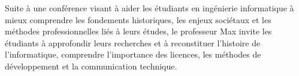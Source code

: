 Suite à une conférence visant à aider les étudiants en ingénierie informatique à mieux comprendre les fondements historiques, les enjeux sociétaux et les méthodes professionnelles liés à leurs études, le professeur Max invite les étudiants à approfondir leurs recherches et à reconstituer l’histoire de l’informatique, comprendre l’importance des licences, les méthodes de développement et la communication technique.
